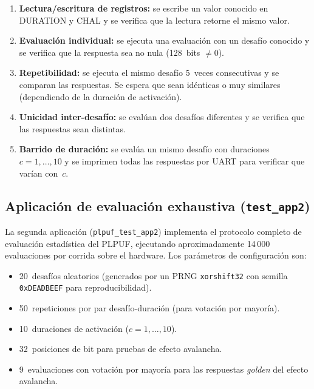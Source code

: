 \begin{enumerate}
  \item \textbf{Lectura/escritura de registros:} se escribe un valor conocido
    en DURATION y CHAL y se verifica que la lectura retorne el mismo valor.

  \item \textbf{Evaluación individual:} se ejecuta una evaluación con un
    desafío conocido y se verifica que la respuesta sea no nula (128~bits
    $\neq 0$).

  \item \textbf{Repetibilidad:} se ejecuta el mismo desafío 5~veces
    consecutivas y se comparan las respuestas. Se espera que sean idénticas o
    muy similares (dependiendo de la duración de activación).

  \item \textbf{Unicidad inter-desafío:} se evalúan dos desafíos diferentes y
    se verifica que las respuestas sean distintas.

  \item \textbf{Barrido de duración:} se evalúa un mismo desafío con
    duraciones $c = 1, \ldots, 10$ y se imprimen todas las respuestas por
    UART para verificar que varían con~$c$.
\end{enumerate}

\subsection{Aplicación de evaluación exhaustiva (\texttt{test\_app2})}
\label{sec:test_app2}

La segunda aplicación (\texttt{plpuf\_test\_app2}) implementa el protocolo
completo de evaluación estadística del PLPUF, ejecutando aproximadamente
14\,000 evaluaciones por corrida sobre el hardware. Los parámetros de configuración son:

\begin{itemize}
  \item 20~desafíos aleatorios (generados por un PRNG \texttt{xorshift32}
    con semilla \texttt{0xDEADBEEF} para reproducibilidad).
  \item 50~repeticiones por par desafío-duración (para votación por mayoría).
  \item 10~duraciones de activación ($c = 1, \ldots, 10$).
  \item 32~posiciones de bit para pruebas de efecto avalancha.
  \item 9~evaluaciones con votación por mayoría para las respuestas
    \textit{golden} del efecto avalancha.
\end{itemize}


